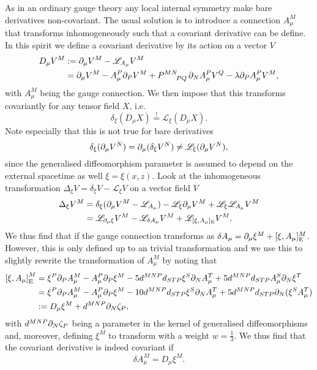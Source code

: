 As in an ordinary gauge theory any local internal symmetry make bare derivatives non-covariant. The usual solution is to introduce a connection $A_\mu^M$ that transforms inhomogeneously such that a covariant derivative can be define. In this spirit we define a covariant derivative by its action on a vector $V$ 
\begin{equation}
    \begin{aligned}
        D_\mu V^M &:= \pd_\mu V^M -\mathscr{L}_{A_\mu}V^M\\
             &= \pd_\mu V^M-A_\mu^P\pd_PV^M+\tensor{P}{^{MN}_{PQ}}\pd_NA_\mu^PV^Q-\lambda\pd_P A_\mu^PV^M,
    \end{aligned}
\end{equation}
with $A_\mu^M$ being the gauge connection. We then impose that this transforms covariantly for any tensor field $X$, i.e.\
\begin{equation}
    \delta_\xi (D_\mu X) \overset{!}{=} \mathscr{L}_\xi (D_\mu X).
\end{equation}
Note especially that this is not true for bare derivatives
\begin{equation}
    \delta_\xi (\partial_\mu V^N) = \partial_\mu(\delta_\xi V^N) \neq \mathscr{L}_\xi (\partial_\mu V^N),
\end{equation}
since the generalised diffeomorphism parameter is assumed to depend on the external spacetime as well $\xi=\xi(x,z)$. Look at the inhomogeneous transformation $\Delta_\xi V = \delta_\xi V -\mathscr{L}_\xi V$ on a vector field $V$
\begin{equation}
    \begin{aligned}
        \Delta_\xi V^M &= \delta_\xi(\partial_\mu V^M-\mathscr{L}_{A_\mu})-\mathscr{L}_\xi\partial_\mu V^M+\mathscr{L}_\xi\mathscr{L}_{A_\mu}V^M\\
        &=\mathscr{L}_{\partial_\mu\xi}V^M-\mathscr{L}_{\delta A_\mu}V^M+\mathscr{L}_{[\xi,A_\mu]_{\text{E}}}V^M.
    \end{aligned}
\end{equation}
We thus find that if the gauge connection transforms as $\delta A_\mu = \partial_\mu \xi^M+[\xi,A_\mu]_{\text{E}}^M$. However, this is only defined up to an trivial transformation and we use this to slightly rewrite the transformation of $A_\mu^M$ by noting that 
\begin{equation}
    \begin{aligned}
    \left[\xi,A_\mu\right]_{\text{E}}^M &= \xi^P\partial_PA^M_\mu-A_\mu^P\partial_P\xi^M-5d^{MNP}d_{STP}\xi^S\partial_NA_\mu^T+5d^{MNP}d_{STP}A_\mu^S\partial_N\xi^T \\
    &= \xi^P\partial_PA^M_\mu-A_\mu^P\partial_P\xi^M-10d^{MNP}d_{STP}\xi^S\partial_NA_\mu^T+5d^{MNP}d_{STP}\partial_N (\xi^SA_\mu^T)\\
    &:=D_\mu \xi^M+d^{MNP}\partial_N\zeta_P,
    \end{aligned}
\end{equation}
with $d^{MNP}\partial_N\zeta_P$ being a parameter in the kernel of generalised diffeomorphisms and, moreover, defining $\xi^M$ to transform with a weight $w=\frac{1}{3}$. We thus find that the covariant derivative is indeed covariant if 
\begin{equation}
    \delta A_\mu^M = D_\mu \xi^M. 
\end{equation}

